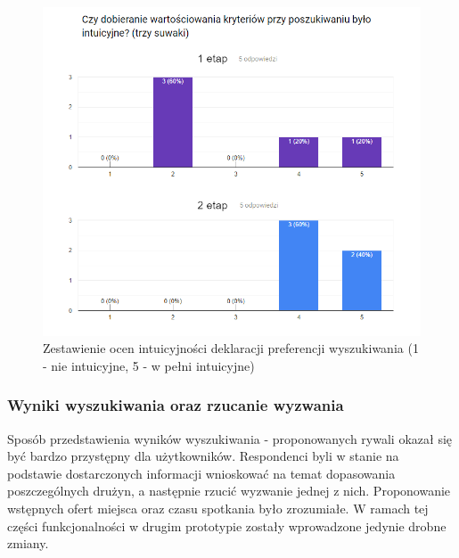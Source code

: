 \begin{figure}[H]
\centering
\includegraphics[width=\linewidth]{07-walidacja/rys/survey-search.png}
\caption{Zestawienie ocen intuicyjności deklaracji preferencji wyszukiwania (1 - nie intuicyjne, 5 - w pełni intuicyjne)}
\label{fig:survey-suwaki}
\end{figure}

\subsubsection{Wyniki wyszukiwania oraz rzucanie wyzwania}

Sposób przedstawienia wyników wyszukiwania - proponowanych rywali okazał się być bardzo przystępny dla użytkowników. Respondenci byli w stanie na podstawie dostarczonych informacji wnioskować na temat dopasowania poszczególnych drużyn, a następnie rzucić wyzwanie jednej z nich. Proponowanie wstępnych ofert miejsca oraz czasu spotkania było zrozumiałe. W ramach tej części funkcjonalności w drugim prototypie zostały wprowadzone jedynie drobne zmiany. 
